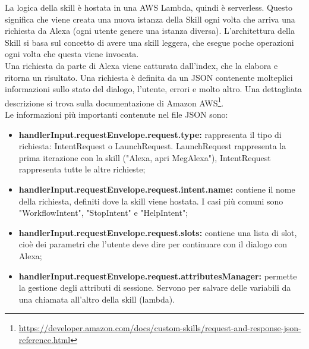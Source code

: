 La logica della skill è hostata in una AWS Lambda, quindi è serverless. Questo significa che viene creata una nuova istanza della Skill ogni volta che arriva una richiesta da Alexa (ogni utente genere una istanza diversa). L'architettura della Skill si basa sul concetto di avere una skill leggera, che esegue poche operazioni ogni volta che questa viene invocata.\\
Una richiesta da parte di Alexa viene catturata dall'index, che la elabora e ritorna un risultato. Una richiesta è definita da un JSON contenente molteplici informazioni sullo stato del dialogo, l'utente, errori e molto altro. Una dettagliata descrizione si trova sulla documentazione di Amazon AWS\footnote{\url{https://developer.amazon.com/docs/custom-skills/request-and-response-json-reference.html}}.\\
Le informazioni più importanti contenute nel file JSON sono:\label{paramsSkill}
\begin{itemize}
    \item \textbf{handlerInput.requestEnvelope.request.type:} rappresenta il tipo di richiesta: IntentRequest o LaunchRequest. LaunchRequest rappresenta la prima iterazione con la skill ("Alexa, apri MegAlexa"), IntentRequest rappresenta tutte le altre richieste;
    \item \textbf{handlerInput.requestEnvelope.request.intent.name:} contiene il nome della richiesta, definiti dove la skill viene hostata. I casi più comuni sono "WorkflowIntent", "StopIntent" e "HelpIntent";
    \item \textbf{handlerInput.requestEnvelope.request.slots:} contiene una lista di slot, cioè dei parametri che l'utente deve dire per continuare con il dialogo con Alexa;
    \item \textbf{handlerInput.requestEnvelope.request.attributesManager:} permette la gestione degli attributi di sessione. Servono per salvare delle variabili da una chiamata all'altro della skill (lambda).
\end{itemize}

